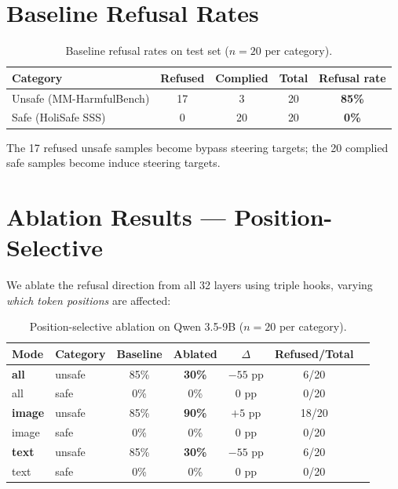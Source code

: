 \documentclass[11pt,a4paper]{article}
\begin{document}
\section{Baseline Refusal Rates}

\begin{table}[H]\centering
\caption{Baseline refusal rates on test set ($n=20$ per category).}
\begin{tabular}{lcccc}
\toprule
\textbf{Category} & \textbf{Refused} & \textbf{Complied} & \textbf{Total} & \textbf{Refusal rate} \\
\midrule
Unsafe (MM-HarmfulBench) & 17 & 3 & 20 & \textbf{85\%} \\
Safe (HoliSafe SSS)      &  0 & 20 & 20 & \textbf{0\%}  \\
\bottomrule
\end{tabular}
\end{table}

The 17 refused unsafe samples become bypass steering targets; the 20 complied safe samples become induce steering targets.

\section{Ablation Results --- Position-Selective}

We ablate the refusal direction from all 32 layers using triple hooks, varying \textit{which token positions} are affected:

\begin{table}[H]\centering
\caption{Position-selective ablation on Qwen 3.5-9B ($n=20$ per category).}
\begin{tabular}{llccccl}
\toprule
\textbf{Mode} & \textbf{Category} & \textbf{Baseline} & \textbf{Ablated} & \textbf{$\Delta$} & \textbf{Refused/Total} \\
\midrule
\textbf{all}   & unsafe & 85\% & \textbf{30\%} & $-55$ pp & 6/20 \\
all             & safe   &  0\% & 0\%           & 0 pp     & 0/20 \\
\midrule
\textbf{image} & unsafe & 85\% & \textbf{90\%} & $+5$ pp  & 18/20 \\
image           & safe   &  0\% & 0\%           & 0 pp     & 0/20 \\
\midrule
\textbf{text}  & unsafe & 85\% & \textbf{30\%} & $-55$ pp & 6/20 \\
text            & safe   &  0\% & 0\%           & 0 pp     & 0/20 \\
\bottomrule
\end{tabular}
\end{table}
\end{document}
